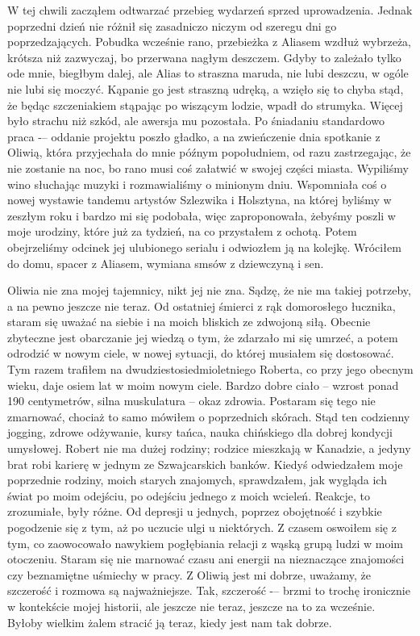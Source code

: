 W tej chwili zacząłem odtwarzać przebieg wydarzeń sprzed uprowadzenia. Jednak poprzedni dzień nie różnił się zasadniczo niczym od szeregu dni go poprzedzających. Pobudka wcześnie rano, przebieżka z Aliasem wzdłuż wybrzeża, krótsza niż zazwyczaj, bo przerwana nagłym deszczem. Gdyby to zależało tylko ode mnie, biegłbym dalej, ale Alias to straszna maruda, nie lubi deszczu, w ogóle nie lubi się moczyć. Kąpanie go jest straszną udręką, a wzięło się to chyba stąd, że będąc szczeniakiem stąpając po wiszącym lodzie, wpadł do strumyka. Więcej było strachu niż szkód, ale awersja mu pozostała. Po śniadaniu standardowo praca -– oddanie projektu poszło gładko, a na zwieńczenie dnia spotkanie z Oliwią, która przyjechała do mnie późnym popołudniem, od razu zastrzegając, że nie zostanie na noc, bo rano musi coś załatwić w swojej części miasta. Wypiliśmy wino słuchając muzyki i rozmawialiśmy o minionym dniu. Wspomniała coś o nowej wystawie tandemu artystów Szlezwika i Holsztyna, na której byliśmy w zeszłym roku i bardzo mi się podobała, więc zaproponowała, żebyśmy poszli w moje urodziny, które już za tydzień, na co przystałem z ochotą. Potem obejrzeliśmy odcinek jej ulubionego serialu i odwiozłem ją na kolejkę. Wróciłem do domu, spacer z Aliasem, wymiana smsów z dziewczyną i sen.

Oliwia nie zna mojej tajemnicy, nikt jej nie zna. Sądzę, że nie ma takiej potrzeby, a na pewno jeszcze nie teraz. Od ostatniej śmierci z rąk domorosłego łucznika, staram się uważać na siebie i na moich bliskich ze zdwojoną siłą. Obecnie zbyteczne jest obarczanie jej wiedzą o tym, że zdarzało mi się umrzeć, a potem odrodzić w nowym ciele, w nowej sytuacji, do której musiałem się dostosować. Tym razem trafiłem na dwudziestosiedmioletniego Roberta, co przy jego obecnym wieku, daje osiem lat w moim nowym ciele. Bardzo dobre ciało -- wzrost ponad 190 centymetrów, silna muskulatura -- okaz zdrowia. Postaram się tego nie zmarnować, chociaż to samo mówiłem o poprzednich skórach. Stąd ten codzienny jogging, zdrowe odżywanie, kursy tańca, nauka chińskiego dla dobrej kondycji umysłowej. Robert nie ma dużej rodziny; rodzice mieszkają w Kanadzie, a jedyny brat robi karierę w jednym ze Szwajcarskich banków. Kiedyś odwiedzałem moje poprzednie rodziny, moich starych znajomych, sprawdzałem, jak wygląda ich świat po moim odejściu, po odejściu jednego z moich wcieleń. Reakcje, to zrozumiałe, były różne. Od depresji u jednych, poprzez obojętność i szybkie pogodzenie się z tym, aż po uczucie ulgi u niektórych. Z czasem oswoiłem się z tym, co zaowocowało nawykiem pogłębiania relacji z wąską grupą ludzi w moim otoczeniu. Staram się nie marnować czasu ani energii na nieznaczące znajomości czy beznamiętne uśmiechy w pracy. Z Oliwią jest mi dobrze, uważamy, że szczerość i rozmowa są najważniejsze. Tak, szczerość -– brzmi to trochę ironicznie w kontekście mojej historii, ale jeszcze nie teraz, jeszcze na to za wcześnie. Byłoby wielkim żalem stracić ją teraz, kiedy jest nam tak dobrze.

